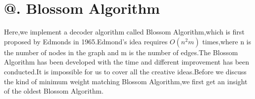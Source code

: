 \documentclass[
	a4paper, %
	10pt, %
	unnumberedsections, %
	twoside, %
]{LTJournalArticle}
\makeatletter
\newcommand{\Rmnum}[1]{\expandafter\@slowromancap\romannumeral #1@}
\makeatother
\begin{document}
\section{\Rmnum{3}. Blossom Algorithm}
	Here,we implement a decoder algorithm called Blossom Algorithm,which is first proposed by Edmonds in 1965.Edmond's idea requires $O(n^2m)$ times,where n is the number of nodes in the graph and m is the number of edges.The Blossom Algorithm has been developed with the time and different improvement has been conducted.It is impossible for us to cover all the creative ideas.Before we discuss the kind of minimum weight matching Blossom Algorithm,we first get an insight of the oldest Blossom Algorithm.
\begin{enumerate}


\end{enumerate}
\end{document}
